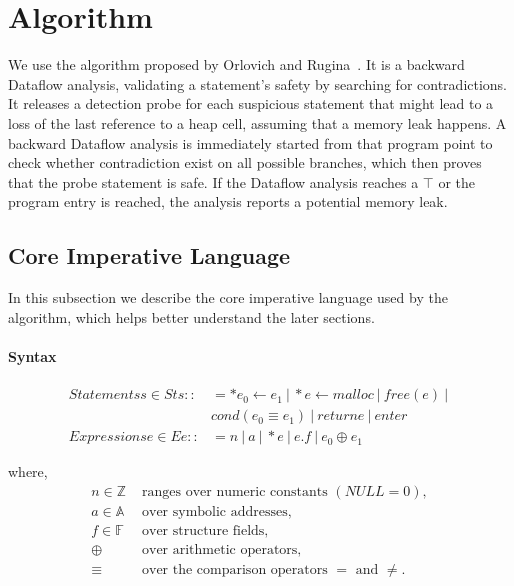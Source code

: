 \section{Algorithm}
\label{s:algorithm}

We use the algorithm proposed by Orlovich and Rugina~\cite{rugina}. It is a 
backward Dataflow analysis, validating a statement's safety by searching for 
contradictions. It releases a detection probe for each suspicious statement 
that might lead to a loss of the last reference to a heap cell, assuming that 
a memory leak happens. A backward Dataflow analysis is immediately started from
that program point to check whether contradiction exist on all possible 
branches, which then proves that the probe statement is safe. If the Dataflow analysis 
reaches a $\top$ or the program entry is reached, the analysis reports a 
potential memory leak.


\subsection{Core Imperative Language}
\label{ss:semantics}

In this subsection we describe the core imperative language 
used by the algorithm, which helps better understand the later sections.

\paragraph{Syntax} 
\begin{align*}
  Statements s\in St s:: &= *e_0\gets e_1\ |\ *e\gets malloc\ |\ free(e)\ |\ \\
                         &     cond(e_0\equiv e_1)\ |\ return e\ |\ enter \\
  Expressions e\in E e:: &= n\ |\ a\ |\ *e\ |\ e.f\ |\ e_0 \oplus e_1 
\end{align*}

where, 
\begin{align*}
  n\in \mathbb{Z} &\text{  ranges over numeric constants $(NULL=0)$}, \\
  a\in \mathbb{A} &\text{  over symbolic addresses,} \\
  f\in \mathbb{F} &\text{  over structure fields,} \\
           \oplus &\text{  over arithmetic operators,} \\
           \equiv &\text{  over the comparison operators $=$ and $\ne$.}
\end{align*}



